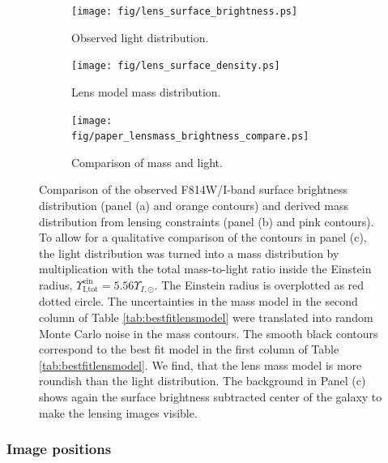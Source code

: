 \documentclass[useAMS,usenatbib]{mnras}
\begin{document}
\begin{figure}
\centering
\begin{subfigure}{.3\textwidth}
  \centering
  \texttt{[image: fig/lens\_surface\_brightness.ps]}
  \caption{Observed light distribution.}
  \label{fig:lenscomparelight}
\end{subfigure}%
\begin{subfigure}{.3\textwidth}
  \centering
  \texttt{[image: fig/lens\_surface\_density.ps]}
  \caption{Lens model mass distribution.}
  \label{fig:lenscomparemass}
\end{subfigure}
\begin{subfigure}{.3\textwidth}
  \centering
  \texttt{[image: fig/paper\_lensmass\_brightness\_compare.ps]}
  \caption{Comparison of mass and light.}
  \label{fig:lenscompareboth}
\end{subfigure}
\caption{Comparison of the observed F814W/I-band surface brightness distribution (panel (a) and orange contours) and derived mass distribution from lensing constraints (panel (b) and pink contours). To allow for a qualitative comparison of the contours in panel (c), the light distribution was turned into a mass distribution by multiplication with the total mass-to-light ratio inside the Einstein radius, $\Upsilon_\text{I,tot}^\text{ein} = 5.56 \Upsilon_{I,\odot}$. The Einstein radius is overplotted as red dotted circle. The uncertainties in the mass model in the second column of Table \ref{tab:bestfitlensmodel} were translated into random Monte Carlo noise in the mass contours. The smooth black contours correspond to the best fit model in the first column of Table \ref{tab:bestfitlensmodel}. We find, that the lens mass model is more roundish than the light distribution. The background in Panel (c) shows again the surface brightness subtracted center of the galaxy to make the lensing images visible.}
\label{fig:lenslightcompareALL}
\end{figure}


\subsubsection{Image positions}
\end{document}
